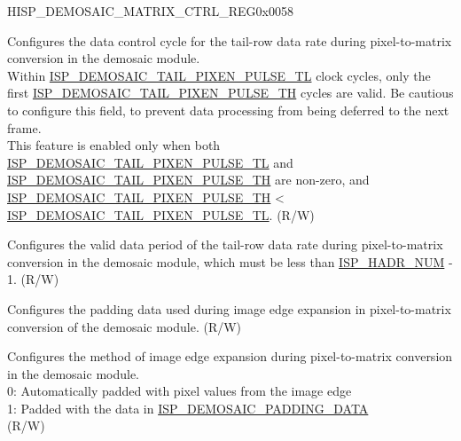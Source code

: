 \begin{register}{H}{ISP\_DEMOSAIC\_MATRIX\_CTRL\_REG}{0x0058}\label{regdesc:ISPDEMOSAICMATRIXCTRLREG}
%
%
%
%
%
\regnewline%
\begin{regdesc}\begin{reglist}
\label{fielddesc:ISPDEMOSAICTAILPIXENPULSETL}\item [ISP\_DEMOSAIC\_TAIL\_PIXEN\_PULSE\_TL] Configures the data control cycle for the tail-row data rate during pixel-to-matrix conversion in the demosaic module.\\Within \hyperref[fielddesc:ISPDEMOSAICTAILPIXENPULSETL]{ISP\_DEMOSAIC\_TAIL\_PIXEN\_PULSE\_TL} clock cycles, only the first \hyperref[fielddesc:ISPDEMOSAICTAILPIXENPULSETH]{ISP\_DEMOSAIC\_TAIL\_PIXEN\_PULSE\_TH} cycles are valid. Be cautious to configure this field, to prevent data processing from being deferred to the next frame.\\This feature is enabled only when both \hyperref[fielddesc:ISPDEMOSAICTAILPIXENPULSETL]{ISP\_DEMOSAIC\_TAIL\_PIXEN\_PULSE\_TL} and \hyperref[fielddesc:ISPDEMOSAICTAILPIXENPULSETH]{ISP\_DEMOSAIC\_TAIL\_PIXEN\_PULSE\_TH} are non-zero, and \hyperref[fielddesc:ISPDEMOSAICTAILPIXENPULSETH]{ISP\_DEMOSAIC\_TAIL\_PIXEN\_PULSE\_TH} < \hyperref[fielddesc:ISPDEMOSAICTAILPIXENPULSETL]{ISP\_DEMOSAIC\_TAIL\_PIXEN\_PULSE\_TL}. (R/W)
\label{fielddesc:ISPDEMOSAICTAILPIXENPULSETH}\item [ISP\_DEMOSAIC\_TAIL\_PIXEN\_PULSE\_TH] Configures the valid data period of the tail-row data rate during pixel-to-matrix conversion in the demosaic module, which must be less than \hyperref[fielddesc:ISPHADRNUM]{ISP\_HADR\_NUM} - 1. (R/W)
\label{fielddesc:ISPDEMOSAICPADDINGDATA}\item [ISP\_DEMOSAIC\_PADDING\_DATA] Configures the padding data used during image edge expansion in pixel-to-matrix conversion of the demosaic module. (R/W)
\label{fielddesc:ISPDEMOSAICPADDINGMODE}\item [ISP\_DEMOSAIC\_PADDING\_MODE] Configures the method of image edge expansion during pixel-to-matrix conversion in the demosaic module.\\0: Automatically padded with pixel values from the image edge\\1: Padded with the data in \hyperref[fielddesc:ISPDEMOSAICPADDINGDATA]{ISP\_DEMOSAIC\_PADDING\_DATA}\\(R/W)
\end{reglist}\end{regdesc}
\end{register}


